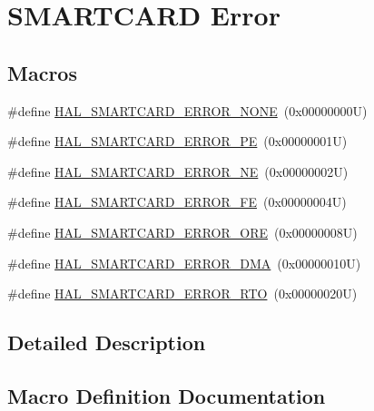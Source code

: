 \hypertarget{group___s_m_a_r_t_c_a_r_d___error}{}\section{S\+M\+A\+R\+T\+C\+A\+RD Error}
\label{group___s_m_a_r_t_c_a_r_d___error}
\subsection*{Macros}
\begin{DoxyCompactItemize}
\item 
\#define \hyperlink{group___s_m_a_r_t_c_a_r_d___error_ga0a10397d49336206efa6dce68b1c34a0}{H\+A\+L\+\_\+\+S\+M\+A\+R\+T\+C\+A\+R\+D\+\_\+\+E\+R\+R\+O\+R\+\_\+\+N\+O\+NE}~(0x00000000\+U)
\item 
\#define \hyperlink{group___s_m_a_r_t_c_a_r_d___error_gaa84e746eaf686e07ef7b9c2e3afd11a8}{H\+A\+L\+\_\+\+S\+M\+A\+R\+T\+C\+A\+R\+D\+\_\+\+E\+R\+R\+O\+R\+\_\+\+PE}~(0x00000001\+U)
\item 
\#define \hyperlink{group___s_m_a_r_t_c_a_r_d___error_ga5050fe3b494349674dea76bebb837943}{H\+A\+L\+\_\+\+S\+M\+A\+R\+T\+C\+A\+R\+D\+\_\+\+E\+R\+R\+O\+R\+\_\+\+NE}~(0x00000002\+U)
\item 
\#define \hyperlink{group___s_m_a_r_t_c_a_r_d___error_gaa8166c45a9433d9840d33a047c9bb0c0}{H\+A\+L\+\_\+\+S\+M\+A\+R\+T\+C\+A\+R\+D\+\_\+\+E\+R\+R\+O\+R\+\_\+\+FE}~(0x00000004\+U)
\item 
\#define \hyperlink{group___s_m_a_r_t_c_a_r_d___error_ga6e65c29c6be8407ab5773b3f8d0795cc}{H\+A\+L\+\_\+\+S\+M\+A\+R\+T\+C\+A\+R\+D\+\_\+\+E\+R\+R\+O\+R\+\_\+\+O\+RE}~(0x00000008\+U)
\item 
\#define \hyperlink{group___s_m_a_r_t_c_a_r_d___error_ga52171ccaca1197e42db9d2a08bc77c63}{H\+A\+L\+\_\+\+S\+M\+A\+R\+T\+C\+A\+R\+D\+\_\+\+E\+R\+R\+O\+R\+\_\+\+D\+MA}~(0x00000010\+U)
\item 
\#define \hyperlink{group___s_m_a_r_t_c_a_r_d___error_gaac1ec232e300339b5c5ac553259d414a}{H\+A\+L\+\_\+\+S\+M\+A\+R\+T\+C\+A\+R\+D\+\_\+\+E\+R\+R\+O\+R\+\_\+\+R\+TO}~(0x00000020\+U)
\end{DoxyCompactItemize}


\subsection{Detailed Description}


\subsection{Macro Definition Documentation}
\mbox{\label{group___s_m_a_r_t_c_a_r_d___error_ga52171ccaca1197e42db9d2a08bc77c63}} 
